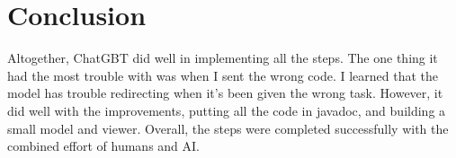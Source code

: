 \documentclass[a4paper,11pt]{article}
\begin{document}
\section*{Conclusion}
Altogether, ChatGBT did well in implementing all the steps. The one thing it had the most trouble with was when I sent the wrong code. I learned that the model has trouble redirecting when it's been given the wrong task. However, it did well with the improvements, putting all the code in javadoc, and building a small model and viewer. Overall, the steps were completed successfully with the combined effort of humans and AI.  
\end{document}
